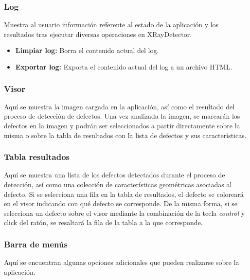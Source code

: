 
\subsubsection*{Log}
Muestra al usuario información referente al estado de la aplicación y los resultados tras ejecutar diversas operaciones en XRayDetector.

\begin{itemize}
\item \textbf{Limpiar log:} Borra el contenido actual del log.
\item \textbf{Exportar log:} Exporta el contenido actual del log a un archivo HTML.
\end{itemize}


\subsubsection*{Visor}
Aquí se muestra la imagen cargada en la aplicación, así como el resultado del proceso de detección de defectos. Una vez analizada la imagen, se marcarán los defectos en la imagen y podrán ser seleccionados a partir directamente sobre la misma o sobre la tabla de resultados con la lista de defectos y sus características.



\subsubsection*{Tabla resultados}
Aquí se muestra una lista de los defectos detectados durante el proceso de detección, así como una colección de características geométricas asociadas al defecto. Si se selecciona una fila en la tabla de resultados, el defecto se coloreará en el visor indicando con qué defecto se corresponde. De la misma forma, si se selecciona un defecto sobre el visor mediante la combinación de la tecla \textit{control} y click del ratón, se resaltará la fila de la tabla a la que corresponde.



\subsubsection*{Barra de menús}
Aquí se encuentran algunas opciones adicionales que pueden realizarse sobre la aplicación.

